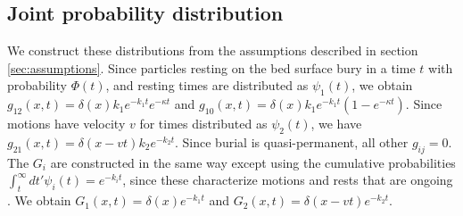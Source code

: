 \subsection{Joint probability distribution}
\label{sec:solution}

We construct these distributions from the assumptions described in section \ref{sec:assumptions}.
Since particles resting on the bed surface bury in a time $t$ with probability $\Phi(t)$, and resting times are distributed as $\psi_1(t)$, we obtain $g_{12}(x,t) = \delta(x)k_1e^{-k_1t}e^{-\kappa t}$ and $g_{10}(x,t) = \delta(x) k_1 e^{-k_1 t}(1-e^{-\kappa t})$. Since motions have velocity $v$ for times distributed as $\psi_2(t)$, we have $g_{21}(x,t) = \delta(x-vt)k_2e^{-k_2 t}$.
Since burial is quasi-permanent, all other $g_{ij} = 0$.
The $G_i$ are constructed in the same way except using the cumulative probabilities $\int_t^\infty dt'\psi_i(t) = e^{-k_i t}$, since these characterize motions and rests that are ongoing \citep{Weiss1994}.
We obtain $G_1(x,t) = \delta(x)e^{-k_1t}$ and $G_2(x,t) = \delta(x-vt)e^{-k_2 t}$.

